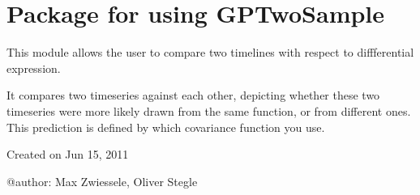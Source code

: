 \documentclass[letterpaper,10pt,english]{sphinxmanual}
\begin{document}
\section{Package for using GPTwoSample}
\label{base:package-for-using-gptwosample}\label{base::doc}
This module allows the user to compare two timelines with respect to diffferential expression.

It compares two timeseries against each other, depicting whether these two
timeseries were more likely drawn from the same function, or from
different ones. This prediction is defined by which covariance function  you use.

Created on Jun 15, 2011

@author: Max Zwiessele, Oliver Stegle
\end{document}

